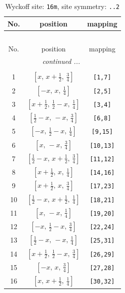 \documentclass[fleqn,8pt]{jsarticle}
\begin{document}
\renewcommand{\arraystretch}{1.2}
\begin{longtable}{ccc}
\caption{Wyckoff site: {\tt 16m}, site symmetry: {\tt ..2}}
 \\
 \hline \hline
No. & position & mapping \\ \hline \endfirsthead

\multicolumn{2}{l}{\tablename\ \thetable{}} \\
 \hline \hline
No. & position & mapping \\ \hline \endhead

 \hline \hline
\multicolumn{2}{r}{\footnotesize\it continued ...} \\ \endfoot

 \hline \hline
\multicolumn{2}{r}{} \\ \endlastfoot

1 & $\left[ x,\, x + \frac{1}{2},\, \frac{3}{4} \right]$ & {\tt [1,7]} \\ \hline
2 & $\left[ - x,\, x,\, \frac{1}{4} \right]$ & {\tt [2,5]} \\ \hline
3 & $\left[ x + \frac{1}{2},\, \frac{1}{2} - x,\, \frac{1}{4} \right]$ & {\tt [3,4]} \\ \hline
4 & $\left[ \frac{1}{2} - x,\, - x,\, \frac{3}{4} \right]$ & {\tt [6,8]} \\ \hline
5 & $\left[ - x,\, \frac{1}{2} - x,\, \frac{1}{4} \right]$ & {\tt [9,15]} \\ \hline
6 & $\left[ x,\, - x,\, \frac{3}{4} \right]$ & {\tt [10,13]} \\ \hline
7 & $\left[ \frac{1}{2} - x,\, x + \frac{1}{2},\, \frac{3}{4} \right]$ & {\tt [11,12]} \\ \hline
8 & $\left[ x + \frac{1}{2},\, x,\, \frac{1}{4} \right]$ & {\tt [14,16]} \\ \hline
9 & $\left[ x + \frac{1}{2},\, x,\, \frac{3}{4} \right]$ & {\tt [17,23]} \\ \hline
10 & $\left[ \frac{1}{2} - x,\, x + \frac{1}{2},\, \frac{1}{4} \right]$ & {\tt [18,21]} \\ \hline
11 & $\left[ x,\, - x,\, \frac{1}{4} \right]$ & {\tt [19,20]} \\ \hline
12 & $\left[ - x,\, \frac{1}{2} - x,\, \frac{3}{4} \right]$ & {\tt [22,24]} \\ \hline
13 & $\left[ \frac{1}{2} - x,\, - x,\, \frac{1}{4} \right]$ & {\tt [25,31]} \\ \hline
14 & $\left[ x + \frac{1}{2},\, \frac{1}{2} - x,\, \frac{3}{4} \right]$ & {\tt [26,29]} \\ \hline
15 & $\left[ - x,\, x,\, \frac{3}{4} \right]$ & {\tt [27,28]} \\ \hline
16 & $\left[ x,\, x + \frac{1}{2},\, \frac{1}{4} \right]$ & {\tt [30,32]} \\
\end{longtable}
\end{document}
